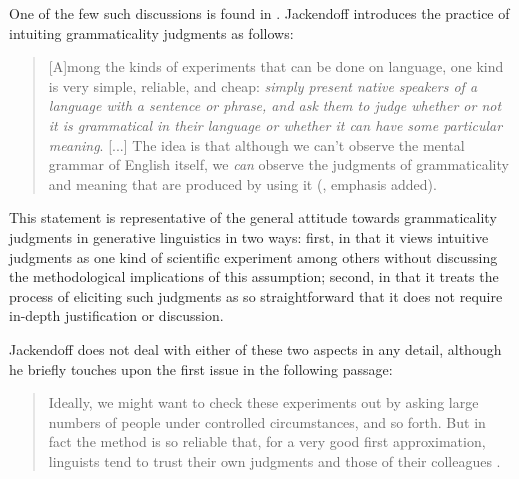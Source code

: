 One of the few such discussions is found in \citet{jackendoff_patterns_1994}. Jackendoff introduces the practice of intuiting grammaticality judgments as follows:

\begin{quote}
[A]mong the kinds of experiments that can be done on language, one kind is very simple, reliable, and cheap: \emph{simply present native speakers of a language with a sentence or phrase, and ask them to judge whether or not it is grammatical in their language or whether it can have some particular meaning}. [...] The idea is that although we can't observe the mental grammar of English itself, we \emph{can} observe the judgments of grammaticality and meaning that are produced by using it (\citealt[47]{jackendoff_patterns_1994}, emphasis added).
\end{quote}

This statement is representative of the general attitude towards grammaticality judgments in generative linguistics in two ways: first, in that it views intuitive judgments as one kind of scientific experiment among others without discussing the methodological implications of this assumption; second, in that it treats the process of eliciting such judgments as so straightforward that it does not require in-depth justification or discussion.

Jackendoff does not deal with either of these two aspects in any detail, although he briefly touches upon the first issue in the following passage:

\begin{quote}
Ideally, we might want to check these experiments out by asking large numbers of people under controlled circumstances, and so forth. But in fact the method is so reliable that, for a very good first approximation, linguists tend to trust their own judgments and those of their colleagues \citep[48]{jackendoff_patterns_1994}.
\end{quote}

